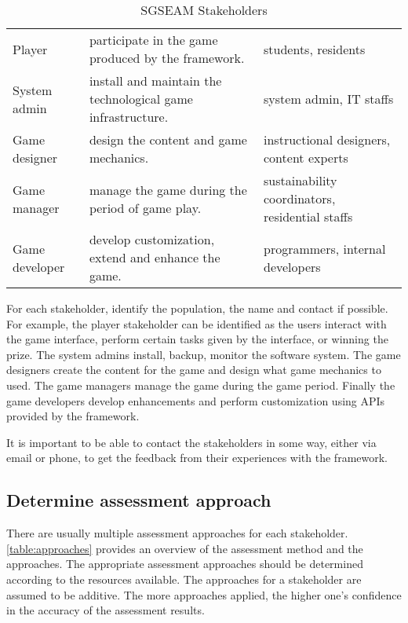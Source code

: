 \begin{table}[ht!]
  \centering
  \begin{tabular}{|p{}|P{0.42\columnwidth}|P{0.28\columnwidth}|}
    \hline
     &
     &
     \\
    \hline
    Player &
    participate in the game produced by the framework. &
    students, residents \\
    \hline
    System admin &
    install and maintain the technological game infrastructure. &
    system admin, IT staffs \\
    \hline
    Game designer &
    design the content and game mechanics. &
    instructional designers, content experts \\
    \hline
    Game manager &
    manage the game during the period of game play.&
    sustainability coordinators, residential staffs\\
    \hline
    Game developer &
    develop customization, extend and enhance the game. &
    programmers, internal developers \\
    \hline
  \end{tabular}
  \caption{SGSEAM Stakeholders}
  \label{table:stakeholders}
\end{table}

For each stakeholder, identify the population, the name and contact if possible. For example, the 
player stakeholder can be identified as the users interact with the game interface, perform certain tasks given by the interface, or winning the prize. The system admins install, backup, monitor the software system. The game designers create the content for the game and design what game mechanics to used. The game managers manage the game during the game period. Finally the game developers develop enhancements and perform customization using APIs provided by the framework.

It is important to be able to contact the stakeholders in some way, either via email or phone, to get the feedback from their experiences with the framework.

\subsection{Determine assessment approach}

There are usually multiple assessment approaches for each stakeholder.  \autoref{table:approaches} provides 
an overview of the assessment method and the approaches. The appropriate assessment approaches should 
be determined according to the resources available. The approaches for a stakeholder are assumed to be additive. The more 
approaches applied, the higher one's confidence in the accuracy of the assessment results.


